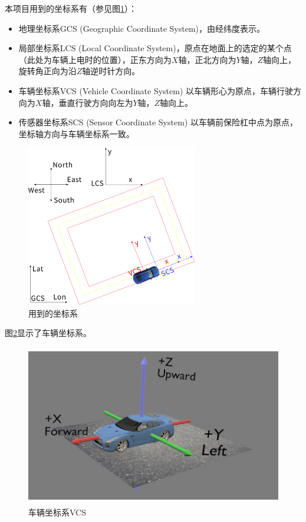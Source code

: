 \documentclass[12pt,a4paper]{article}
\begin{document}
本项目用到的坐标系有（参见图\ref{f_coordinatesystem}）：
\begin{itemize}
\item 地理坐标系GCS (Geographic Coordinate System)，由经纬度表示。
\item 局部坐标系LCS (Local Coordinate System)，原点在地面上的选定的某个点（此处为车辆上电时的位置），正东方向为$X$轴，正北方向为$Y$轴，$Z$轴向上，旋转角正向为沿$Z$轴逆时针方向。
\item 车辆坐标系VCS (Vehicle Coordinate System) 以车辆形心为原点，车辆行驶方向为$X$轴，垂直行驶方向向左为$Y$轴，$Z$轴向上。
\item 传感器坐标系SCS (Sensor Coordinate System) 以车辆前保险杠中点为原点，坐标轴方向与车辆坐标系一致。
\end{itemize}
\begin{figure}[!htb]
  \centering
  \includegraphics[height=200pt]{coordinatesystems.jpg}
  \caption{用到的坐标系 \label{f_coordinatesystem}}
\end{figure}
图\ref{f_vcs}显示了车辆坐标系。
\begin{figure}[!htb]
  \centering
  \includegraphics[height=200pt]{vcs_blender.jpg}
  \caption{车辆坐标系VCS \label{f_vcs}}
\end{figure}
\end{document}
